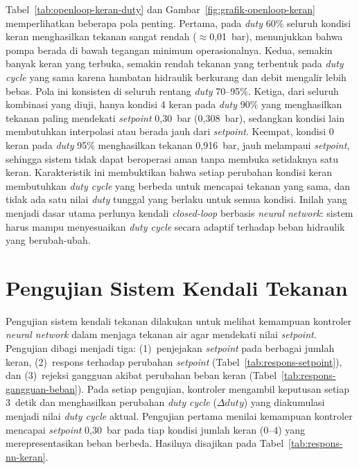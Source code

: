 Tabel~\ref{tab:openloop-keran-duty} dan Gambar~\ref{fig:grafik-openloop-keran}
memperlihatkan beberapa pola penting.
Pertama, pada \emph{duty} 60\% seluruh kondisi keran menghasilkan tekanan sangat
rendah ($\approx$0,01~bar), menunjukkan bahwa pompa berada di bawah tegangan
minimum operasionalnya.
Kedua, semakin banyak keran yang terbuka, semakin rendah tekanan yang terbentuk
pada \emph{duty cycle} yang sama karena hambatan hidraulik berkurang dan debit
mengalir lebih bebas. Pola ini konsisten di seluruh rentang \emph{duty} 70--95\%.
Ketiga, dari seluruh kombinasi yang diuji, hanya kondisi 4 keran pada
\emph{duty} 90\% yang menghasilkan tekanan paling mendekati \emph{setpoint}
0,30~bar (0,308~bar), sedangkan kondisi lain membutuhkan interpolasi atau
berada jauh dari \emph{setpoint}.
Keempat, kondisi 0 keran pada \emph{duty} 95\% menghasilkan tekanan 0,916~bar,
jauh melampaui \emph{setpoint}, sehingga sistem tidak dapat beroperasi aman
tanpa membuka setidaknya satu keran.
Karakteristik ini membuktikan bahwa setiap perubahan kondisi keran membutuhkan
\emph{duty cycle} yang berbeda untuk mencapai tekanan yang sama, dan tidak ada
satu nilai \emph{duty} tunggal yang berlaku untuk semua kondisi.
Inilah yang menjadi dasar utama perlunya kendali \emph{closed-loop} berbasis
\emph{neural network}: sistem harus mampu menyesuaikan \emph{duty cycle} secara
adaptif terhadap beban hidraulik yang berubah-ubah.

\section{Pengujian Sistem Kendali Tekanan}
\label{sec:pengujian-sistem-kendali}

Pengujian sistem kendali tekanan dilakukan untuk melihat kemampuan kontroler
\emph{neural network} dalam menjaga tekanan air agar mendekati nilai
\emph{setpoint}. Pengujian dibagi menjadi tiga: (1)~penjejakan \emph{setpoint}
pada berbagai jumlah keran,
(2)~respons terhadap perubahan \emph{setpoint} (Tabel~\ref{tab:respons-setpoint}),
dan (3)~rejeksi gangguan akibat perubahan beban keran
(Tabel~\ref{tab:respons-gangguan-beban}). Pada setiap pengujian, kontroler
mengambil keputusan setiap 3~detik dan menghasilkan perubahan \emph{duty cycle}
($\Delta duty$) yang diakumulasi menjadi nilai \emph{duty cycle} aktual.
Pengujian pertama menilai kemampuan kontroler mencapai \emph{setpoint} 0,30~bar
pada tiap kondisi jumlah keran (0--4) yang merepresentasikan beban berbeda.
Hasilnya disajikan pada Tabel~\ref{tab:respons-nn-keran}.

